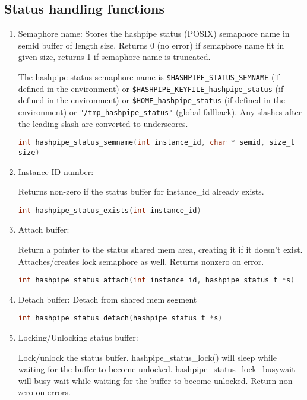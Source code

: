 \documentclass[12pt]{article}
\def\clst{\lstinline[basicstyle=\ttfamily,breaklines=true,language=C]}
\begin{document}
\subsection*{Status handling functions}
\begin{enumerate}

\item Semaphore name:
Stores the hashpipe status (POSIX) semaphore name in semid buffer of length
size.  Returns 0 (no error) if semaphore name fit in given size, returns 1
if semaphore name is truncated.

The hashpipe status semaphore name is {\tt \$HASHPIPE\_STATUS\_SEMNAME} 
(if defined in the environment) or {\tt \${HASHPIPE\_KEYFILE}\_hashpipe\_status} 
(if defined in the environment) or {\tt \${HOME}\_hashpipe\_status} 
(if defined in the environment) or {\tt "/tmp\_hashpipe\_status"} 
(global fallback).  Any slashes after the leading slash are converted to 
underscores.

\clst{int hashpipe_status_semname(int instance_id, char * semid, size_t size) }

\item Instance ID number:

Returns non-zero if the status buffer for instance\_id already exists.

\clst{int hashpipe_status_exists(int instance_id)}

\item Attach buffer:

Return a pointer to the status shared mem area,
creating it if it doesn't exist.  Attaches/creates
lock semaphore as well.  Returns nonzero on error.

\clst{int hashpipe_status_attach(int instance_id, hashpipe_status_t *s) }


\item Detach buffer: Detach from shared mem segment

\clst{int hashpipe_status_detach(hashpipe_status_t *s)}

\item Locking/Unlocking status buffer:

Lock/unlock the status buffer.  hashpipe\_status\_lock() will sleep while
waiting for the buffer to become unlocked.  hashpipe\_status\_lock\_busywait
will busy-wait while waiting for the buffer to become unlocked.  Return
non-zero on errors.

\begin{centering}
\begin{lstlisting}


\end{lstlisting}
\end{centering}
\end{enumerate}
\end{document}
